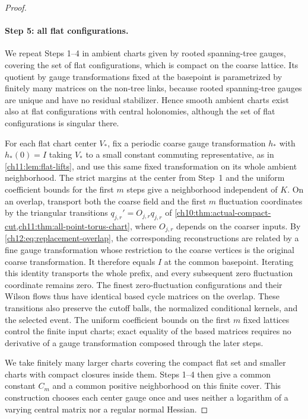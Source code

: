 \begin{proof}
\paragraph{Step 5: all flat configurations.}
We repeat Steps 1--4 in ambient charts given by rooted spanning-tree gauges, covering the set of flat configurations, which is compact on the coarse lattice. Its quotient by gauge transformations fixed at the basepoint is parametrized by finitely many matrices on the non-tree links, because rooted spanning-tree gauges are unique and have no residual stabilizer. Hence smooth ambient charts exist also at flat configurations with central holonomies, although the set of flat configurations is singular there.

For each flat chart center $V_*$, fix a periodic coarse gauge transformation $h_*$ with $h_*(0)=I$ taking $V_*$ to a small constant commuting representative, as in \cref{ch11:lem:flat-lifts}, and use this same fixed transformation on its whole ambient neighborhood. The strict margins at the center from Step~1 and the uniform coefficient bounds for the first $m$ steps give a neighborhood independent of $K$. On an overlap, transport both the coarse field and the first $m$ fluctuation coordinates by the triangular transitions $q_{j,r}'=O_{j,r}q_{j,r}$ of \cref{ch10:thm:actual-compact-cut,ch11:thm:all-point-torus-chart}, where $O_{j,r}$ depends on the coarser inputs. By \eqref{ch12:eq:replacement-overlap}, the corresponding reconstructions are related by a fine gauge transformation whose restriction to the coarse vertices is the original coarse transformation. It therefore equals $I$ at the common basepoint. Iterating this identity transports the whole prefix, and every subsequent zero fluctuation coordinate remains zero. The finest zero-fluctuation configurations and their Wilson flows thus have identical based cycle matrices on the overlap. These transitions also preserve the cutoff balls, the normalized conditional kernels, and the selected event. The uniform coefficient bounds on the first $m$ fixed lattices control the finite input charts; exact equality of the based matrices requires no derivative of a gauge transformation composed through the later steps.

We take finitely many larger charts covering the compact flat set and smaller charts with compact closures inside them. Steps 1--4 then give a common constant $C_m$ and a common positive neighborhood on this finite cover. This construction chooses each center gauge once and uses neither a logarithm of a varying central matrix nor a regular normal Hessian.


\end{proof}
